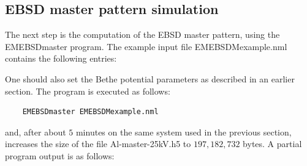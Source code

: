 \documentclass[DIV=calc, paper=letter, fontsize=11pt]{scrartcl}	 %
\begin{document}
\subsection{EBSD master pattern simulation}
The next step is the computation of the EBSD master pattern, using the \textsf{EMEBSDmaster} program. 
The example input file \textsf{EMEBSDMexample.nml} contains the following entries:

One should also set the Bethe potential parameters as described in an earlier section.  The program is executed as follows:
\begin{verbatim}
	EMEBSDmaster EMEBSDMexample.nml
\end{verbatim}
and, after about $5$ minutes on the same system used in the previous section, 
increases the size of the file \textsf{Al-master-25kV.h5} to $197,182,732$ bytes.  A partial program output
is as follows:
\end{document}
